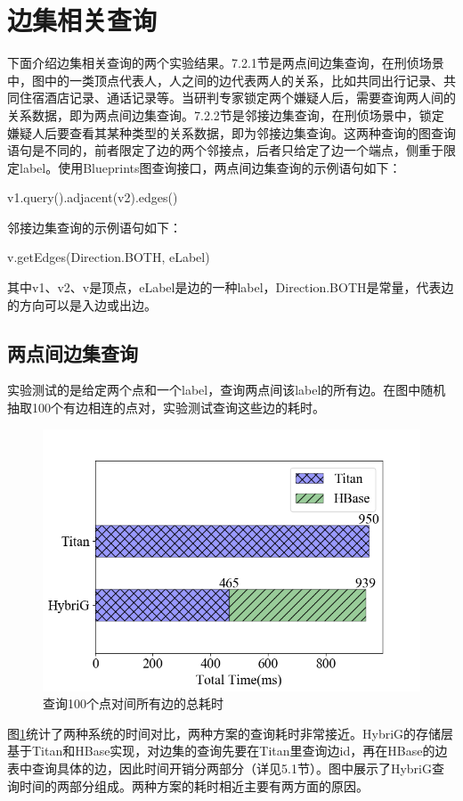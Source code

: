 \section{边集相关查询}
下面介绍边集相关查询的两个实验结果。7.2.1节是两点间边集查询，在刑侦场景中，图中的一类顶点代表人，人之间的边代表两人的关系，比如共同出行记录、共同住宿酒店记录、通话记录等。当研判专家锁定两个嫌疑人后，需要查询两人间的关系数据，即为两点间边集查询。7.2.2节是邻接边集查询，在刑侦场景中，锁定嫌疑人后要查看其某种类型的关系数据，即为邻接边集查询。这两种查询的图查询语句是不同的，前者限定了边的两个邻接点，后者只给定了边一个端点，侧重于限定label。使用Blueprints图查询接口，两点间边集查询的示例语句如下：
\begin{center}
  v1.query().adjacent(v2).edges()
\end{center}
邻接边集查询的示例语句如下：
\begin{center}
  v.getEdges(Direction.BOTH, eLabel)
\end{center}
其中v1、v2、v是顶点，eLabel是边的一种label，Direction.BOTH是常量，代表边的方向可以是入边或出边。
\subsection{两点间边集查询}
实验测试的是给定两个点和一个label，查询两点间该label的所有边。在图中随机抽取100个有边相连的点对，实验测试查询这些边的耗时。

\begin{figure}[htbp]
\centering
\includegraphics[width=120mm]{fig/edge_query_perf.png}
\caption{查询100个点对间所有边的总耗时}
\label{fig:edge_query_perf}
\end{figure}

图\ref{fig:edge_query_perf}统计了两种系统的时间对比，两种方案的查询耗时非常接近。HybriG的存储层基于Titan和HBase实现，对边集的查询先要在Titan里查询边id，再在HBase的边表中查询具体的边，因此时间开销分两部分（详见5.1节）。图中展示了HybriG查询时间的两部分组成。两种方案的耗时相近主要有两方面的原因。

